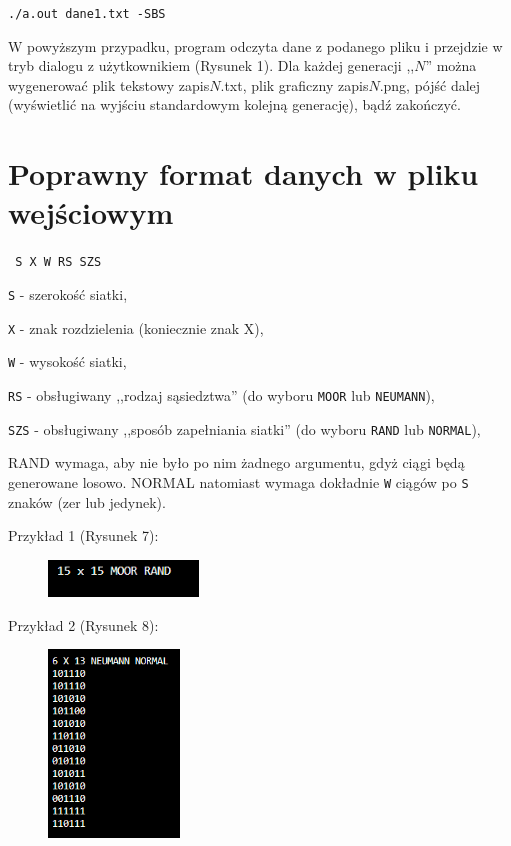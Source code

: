 \documentclass{article}
\begin{document}
{\texttt{./a.out dane1.txt -SBS } 

W powyższym przypadku, program odczyta dane z podanego pliku i przejdzie w tryb dialogu z użytkownikiem (Rysunek 1). Dla każdej generacji ,,$N$'' można wygenerować plik tekstowy zapis$N$.txt, plik graficzny zapis$N$.png, pójść dalej (wyświetlić na wyjściu standardowym kolejną generację), bądź zakończyć.

\section{Poprawny format danych w pliku wejściowym}

\texttt{ S X W RS SZS }

\texttt{S} -  szerokość siatki,

\texttt{X} -  znak rozdzielenia (koniecznie znak X),

\texttt{W} -  wysokość siatki,

\texttt{RS} - obsługiwany ,,rodzaj sąsiedztwa'' (do wyboru \texttt{MOOR} lub \texttt{NEUMANN}),

\texttt{SZS} - obsługiwany ,,sposób zapełniania siatki'' (do wyboru \texttt{RAND} lub \texttt{NORMAL}),


RAND wymaga, aby nie było po nim żadnego argumentu, gdyż ciągi będą generowane losowo. NORMAL natomiast wymaga dokładnie \texttt{W} ciągów po \texttt{S} znaków (zer lub jedynek).

Przykład 1 (Rysunek 7):
\begin{figure}[h]
\centering
\includegraphics[width=4cm]{dobredane.png}
\caption{}
\label{fig:dobredane.png}
\end{figure}


Przykład 2 (Rysunek 8):
\begin{figure}[h]
\centering
\includegraphics[width=3.5cm]{dobredane2.png}
\caption{}
\label{fig:dobredane2.png}
\end{figure}

}
\newpage
{}
\end{document}
